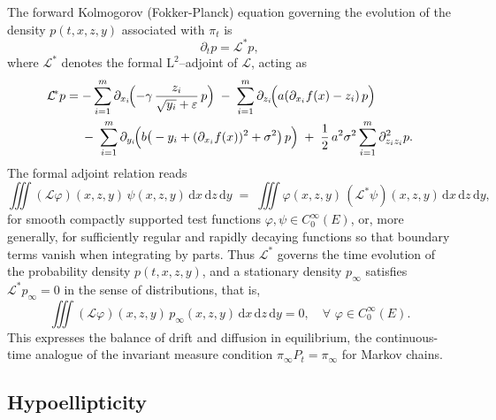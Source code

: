 \documentclass[11pt, a4paper,leqno]{amsart}
\theoremstyle{definition}
\numberwithin{equation}{section}
\begin{document}
The forward Kolmogorov (Fokker-Planck) equation governing the evolution
of the density $p(t,x,z,y)$ associated with $\pi_t$ is
\begin{equation}\label{Fokk}
\partial_t p = {\mathcal{L}}^{\!*} p,
\end{equation}
where ${\mathcal{L}}^{\!*}$ denotes the formal $\mathrm{L}^2$–adjoint of $\mathcal{L}$,
acting as
\begin{equation}\label{Fokkop}
\begin{aligned}
{\mathcal{L}}^{\!*} p
&= -\sum_{i=1}^m \partial_{x_i}\!\Bigl(-\gamma\,\frac{z_i}{\sqrt{y_i}+\varepsilon}\, p\Bigr)
   \;-\;\sum_{i=1}^m \partial_{z_i}\!\Bigl(a(\partial_{x_i}f(x)-z_i)\, p\Bigr)\\
&\quad\;-\;\sum_{i=1}^m \partial_{y_i}\!\Bigl(b\big(-y_i+(\partial_{x_i}f(x))^2+\sigma^2\big)\, p\Bigr)
   \;+\;\frac12\,a^2\sigma^2\sum_{i=1}^m \partial_{z_i z_i}^2  p.
\end{aligned}
\end{equation}
The formal adjoint relation reads
\begin{equation}\label{weak}
\iiint({\mathcal{L}}\varphi)(x,z,y)\, \psi(x,z,y)\,\mathrm{d}x\,\mathrm{d}z\,\mathrm{d}y
\;=\;\iiint \varphi(x,z,y)\, ({\mathcal{L}}^{\!*}\psi)(x,z,y)\,\mathrm{d}x\,\mathrm{d}z\,\mathrm{d}y,
\end{equation}
for smooth compactly supported test functions
$\varphi,\psi\in C_0^\infty(E)$, or, more generally, for sufficiently
regular and rapidly decaying functions so that boundary terms vanish when integrating by parts. Thus ${\mathcal{L}}^{\!*}$ governs the time evolution of the probability density
$p(t,x,z,y)$, and a stationary density $p_\infty$ satisfies ${\mathcal{L}}^{\!*} p_\infty = 0$ in the sense of distributions, that is,
\[
\iiint ({\mathcal{L}}\varphi)(x,z,y)\, p_\infty(x,z,y)\,\mathrm{d}x\,\mathrm{d}z\,\mathrm{d}y = 0,
\quad \forall\,\,\varphi\in C_0^\infty(E).
\]
This expresses the balance of drift and diffusion in equilibrium, the continuous-time
analogue of the invariant measure condition $\pi_\infty P_t = \pi_\infty$ for Markov chains.




\subsection{Hypoellipticity}\label{Hypoellipticity}
\end{document}
